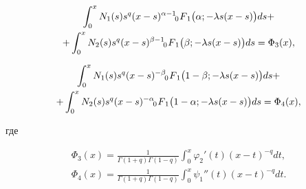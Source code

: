 \begin{multline}

 \int _0^x N_1(s) s^{q} (x-s)^{\alpha-1}  \,\,

F_{\hspace{-4mm}0 \hspace{3mm}1} \bigl(\alpha;-\lambda s (x-s)\bigr) ds + 

\\

\label{dolg:eq43}

+ \int _0^x N_2(s) s^{q} (x-s)^{\beta-1}  \,\,

F_{\hspace{-4mm}0 \hspace{3mm}1} \bigl(\beta;-\lambda s (x-s)\bigr) ds = \Phi_3(x),

\end{multline}

\begin{multline}

 \int _0^x N_1(s) s^{q} (x-s)^{-\beta}  \,\,

F_{\hspace{-4mm}0 \hspace{3mm}1} \bigl(1-\beta;-\lambda s (x-s)\bigr) ds + 

\\

\label{dolg:eq44}

+ \int _0^x N_2(s) s^{q} (x-s)^{-\alpha}  \,\,

F_{\hspace{-4mm}0 \hspace{3mm}1} \bigl(1-\alpha;-\lambda s (x-s)\bigr) ds = \Phi_4(x),

\end{multline}

где

\begin{gather}

\label{dolg:eq45}


\Phi_3(x) = \frac{1}{\Gamma(1+q)\Gamma(1-q)}\int _0^x {\varphi_2}'(t) (x-t)^{-q} dt,\\ 

\Phi_4(x) = \frac{1}{\Gamma(1+q)\Gamma(1-q)}\int _0^x {\psi_1}''(t) (x-t)^{-q} dt.


\end{gather}



